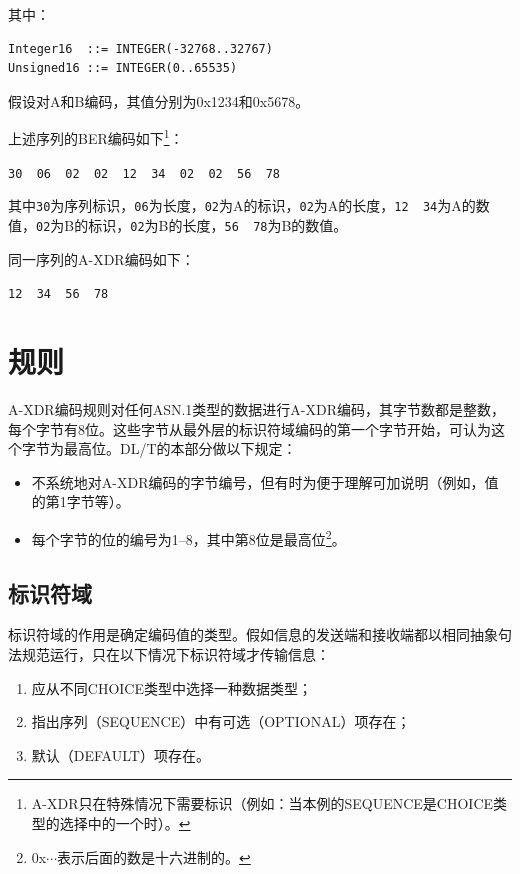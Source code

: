 \documentclass[a4paper,11pt]{ctexart}
\begin{document}
\noindent 其中：
\begin{verbatim}
Integer16  ::= INTEGER(-32768..32767)
Unsigned16 ::= INTEGER(0..65535)
\end{verbatim}

\noindent 假设对A和B编码，其值分别为0x1234和0x5678。

上述序列的BER编码如下\footnote{A-XDR只在特殊情况下需要标识（例如：当本例的SEQUENCE是CHOICE类型的选择中的一个时）。}：

\begin{center}
\texttt{30~~06~~02~~02~~12~~34~~02~~02~~56~~78}
\end{center}

\noindent 其中\texttt{30}为序列标识，\texttt{06}为长度，\texttt{02}为A的标识，\texttt{02}为A的长度，\texttt{12~~34}为A的数值，\texttt{02}为B的标识，\texttt{02}为B的长度，\texttt{56~~78}为B的数值。

同一序列的A-XDR编码如下：

\begin{center}
\texttt{12~~34~~56~~78}
\end{center}

\section{规则}

A-XDR编码规则对任何ASN.1类型的数据进行A-XDR编码，其字节数都是整数，每个字节有8位。这些字节从最外层的标识符域编码的第一个字节开始，可认为这个字节为最高位。DL/T的本部分做以下规定：
\begin{itemize}
\item 不系统地对A-XDR编码的字节编号，但有时为便于理解可加说明（例如，值的第1字节等）。
\item 每个字节的位的编号为1--8，其中第8位是最高位\footnote{0x$\cdots$表示后面的数是十六进制的。}。
\end{itemize}

\subsection{标识符域}

标识符域的作用是确定编码值的类型。假如信息的发送端和接收端都以相同抽象句法规范运行，只在以下情况下标识符域才传输信息：
\begin{enumerate}[label=\alph*)]
\item 应从不同CHOICE类型中选择一种数据类型；
\item 指出序列（SEQUENCE）中有可选（OPTIONAL）项存在；
\item 默认（DEFAULT）项存在。
\end{enumerate}
\end{document}
